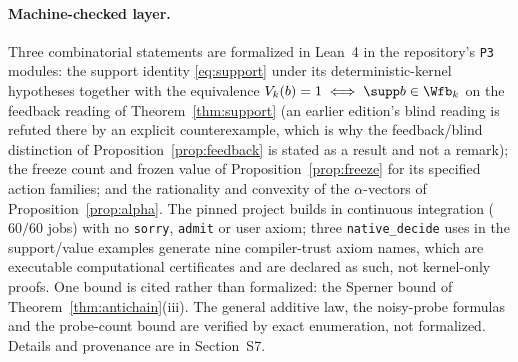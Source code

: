 \paragraph{Machine-checked layer.}
Three combinatorial statements are formalized in Lean~4 \cite{deMouraUllrich2021} in the repository's \texttt{P3} modules: the support identity \eqref{eq:support} under its deterministic-kernel hypotheses together with the equivalence $V_k(b)=1\iff\supp b\in\Wfb_k$ on the feedback reading of Theorem~\ref{thm:support} (an earlier edition's blind reading is refuted there by an explicit counterexample, which is why the feedback/blind distinction of Proposition~\ref{prop:feedback} is stated as a result and not a remark); the freeze count and frozen value of Proposition~\ref{prop:freeze} for its specified action families; and the rationality and convexity of the $\alpha$-vectors of Proposition~\ref{prop:alpha}. The pinned project builds in continuous integration ($60/60$ jobs) with no \texttt{sorry}, \texttt{admit} or user axiom; three \texttt{native\_decide} uses in the support/value examples generate nine compiler-trust axiom names, which are executable computational certificates and are declared as such, not kernel-only proofs. One bound is cited rather than formalized: the Sperner bound of Theorem~\ref{thm:antichain}(iii). The general additive law, the noisy-probe formulas and the probe-count bound are verified by exact enumeration, not formalized. Details and provenance are in Section~S7.
